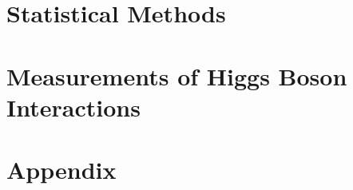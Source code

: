 

\part{Statistical Methods}




\part{Measurements of Higgs Boson Interactions}






\clearpage
{}
\appendix
\renewcommand{\chaptermark}[1]{\markboth{\MakeUppercase{Appendix \hfill \chaptername\ \thechapter.\ #1}}{}}
\part*{Appendix}




\printbibliography

